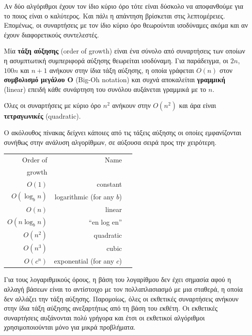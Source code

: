 \documentclass[10pt]{book}
\begin{document}
Αν δύο αλγόριθμοι έχουν τον ίδιο κύριο όρο τότε είναι δύσκολο να αποφανθούμε για το 
ποιος είναι ο καλύτερος. Και πάλι η απάντηση βρίσκεται στις λεπτομέρειες. Επομένως, 
οι συναρτήσεις με τον ίδιο κύριο όρο θεωρούνται ισοδύναμες ακόμα και αν έχουν
διαφορετικούς συντελεστές.


Μία {\bf τάξη αύξησης} (order of growth) είναι ένα σύνολο από συναρτήσεις των οποίων η ασυμπτωτική
συμπεριφορά αύξησης θεωρείται ισοδύναμη.  Για παράδειγμα, οι $2n$, $100n$ και $n+1$ ανήκουν στην
ίδια τάξη αύξησης, η οποία γράφεται $O(n)$ στον {\bf συμβολισμό μεγάλου Ο} (Big-Oh notation)
και συχνά αποκαλείται {\bf γραμμική} (linear) επειδή κάθε συνάρτηση του συνόλου αυξάνεται 
γραμμικά με το $n$.

Όλες οι συναρτήσεις με κύριο όρο $n^2$ ανήκουν στην $O(n^2)$ και άρα είναι {\bf τετραγωνικές}
(quadratic).

Ο ακόλουθος πίνακας δείχνει κάποιες από τις τάξεις αύξησης οι οποίες εμφανίζονται 
συνήθως στην ανάλυση αλγορίθμων, σε αύξουσα σειρά προς την χειρότερη. 

\begin{tabular}{|r|r|r|}
\hline
Order of     &   Name      \\
growth       &               \\
\hline
$O(1)$             & constant \\
$O(\log_b n)$      & logarithmic (for any $b$) \\
$O(n)$             & linear \\
$O(n \log_b n)$    & ``en log en'' \\
$O(n^2)$           & quadratic     \\
$O(n^3)$           & cubic     \\
$O(c^n)$           & exponential (for any $c$)    \\
\hline
\end{tabular}

Για τους λογαριθμικούς όρους, η βάση του λογαρίθμου δεν έχει σημασία αφού η 
αλλαγή βάσεων είναι το αντίστοιχο με τον πολλαπλασιασμό με μια σταθερά, η οποία 
δεν αλλάζει την τάξη αύξησης.  Παρομοίως, όλες οι εκθετικές συναρτήσεις ανήκουν 
στην ίδια τάξη αύξησης ανεξαρτήτως από τη βάση του εκθέτη.  Οι εκθετικές συναρτήσεις
αυξάνονται πολύ γρήγορα και έτσι οι εκθετικοί αλγόριθμοι χρησιμοποιούνται μόνο για μικρά προβλήματα.
\\
\end{document}
